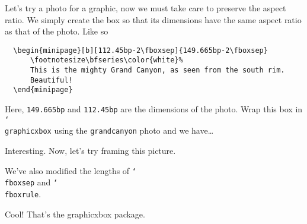 \documentclass{article}
\newcommand{\cs}[1]{\texttt{\char`\\#1}}
\begin{document}
Let's try a photo for a graphic, now we must take care to preserve
the aspect ratio. We simply create the box so that its
dimensions have the same aspect ratio as that of the photo. Like so
{\small\begin{verbatim}
  \begin{minipage}[b][112.45bp-2\fboxsep]{149.665bp-2\fboxsep}
      \footnotesize\bfseries\color{white}%
      This is the mighty Grand Canyon, as seen from the south rim.
      Beautiful!
  \end{minipage}
\end{verbatim}
}Here, \texttt{149.665bp} and \texttt{112.45bp} are the dimensions of the photo.
Wrap this box in \cs{graphicxbox} using the \texttt{grandcanyon} photo and we have\dots
\begin{center}
\end{center}

Interesting. Now, let's try framing this picture.

\begin{center}
\setlength{\fboxrule}{4bp}
\end{center}
We've also modified the lengths of \cs{fboxsep} and \cs{fboxrule}.

Cool! That's the \textsf{graphicxbox} package.
\end{document}

